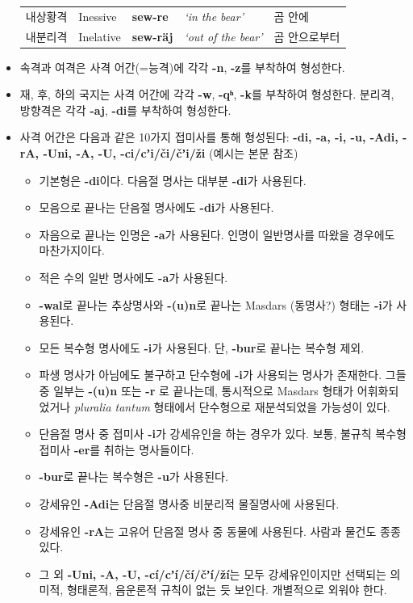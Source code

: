 \begin{itemize}
\begin{table}[H]
{\begin{tabular}{ll>{\bfseries}l>{\itshape}ll}
\\
내상황격	&Inessive		&sew-re			&`in the bear'			&곰 안에\\
내분리격	&Inelative		&sew-räj		&`out of the bear'		&곰 안으로부터\\
\hline
\end{tabular}}
\end{table}
\item 속격과 여격은 사격 어간(=능격)에 각각 \textbf{-n}, \textbf{-z}를 부착하여 형성한다.
\item 재, 후, 하의 국지는 사격 어간에 각각 \textbf{-w}, \textbf{-qʰ}, \textbf{-k}를 부착하여 형성한다. 분리격, 방향격은 각각 \textbf{-aj}, \textbf{-di}를 부착하여 형성한다.
\item 사격 어간은 다음과 같은 10가지 접미사를 통해 형성된다: \textbf{-di, -a, -i, -u, -Adi, -rA, -Uni, -A, -U, -ci/cʼi/či/čʼi/ži} (예시는 본문 참조)
\begin{itemize}
\item 기본형은 \textbf{-di}이다. 다음절 명사는 대부분 \textbf{-di}가 사용된다.
\item 모음으로 끝나는 단음절 명사에도 \textbf{-di}가 사용된다.
\item 자음으로 끝나는 인명은 \textbf{-a}가 사용된다. 인명이 일반명사를 따왔을 경우에도 마찬가지이다.
\item 적은 수의 일반 명사에도 \textbf{-a}가 사용된다.
\item \textbf{-wal}로 끝나는 추상명사와 \textbf{-(u)n}로 끝나는 Masdars (동명사?) 형태는 \textbf{-i}가 사용된다.
\item 모든 복수형 명사에도 \textbf{-i}가 사용된다. 단, \textbf{-bur}로 끝나는 복수형 제외.
\item 파생 명사가 아님에도 불구하고 단수형에 \textbf{-i}가 사용되는 명사가 존재한다. 그들 중 일부는 \textbf{-(u)n} 또는 \textbf{-r} 로 끝나는데, 통시적으로 Masdars 형태가 어휘화되었거나 \textit{pluralia tantum} 형태에서 단수형으로 재분석되었을 가능성이 있다.
\item 단음절 명사 중 접미사 \textbf{-i}가 강세유인을 하는 경우가 있다. 보통, 불규칙 복수형 접미사 \textbf{-er}를 취하는 명사들이다.
\item \textbf{-bur}로 끝나는 복수형은 \textbf{-u}가 사용된다.
\item 강세유인 \textbf{-Adi}는 단음절 명사중 비분리적 물질명사에 사용된다.
\item 강세유인 \textbf{-rA}는 고유어 단음절 명사 중 동물에 사용된다. 사람과 물건도 종종 있다.
\item 그 외 \textbf{-Uni, -A, -U, -cí/cʼí/čí/čʼí/ží}는 모두 강세유인이지만 선택되는 의미적, 형태론적, 음운론적 규칙이 없는 듯 보인다. 개별적으로 외워야 한다.

\end{itemize}
\end{itemize}
